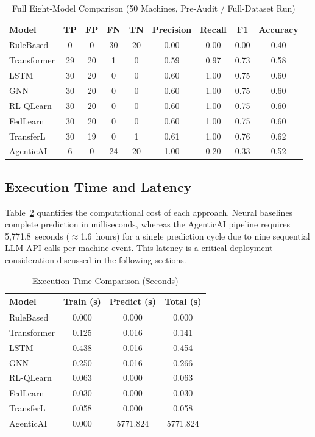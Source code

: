 \begin{table}[htbp]
\centering
\caption{Full Eight-Model Comparison (50 Machines, Pre-Audit / Full-Dataset Run)}
\label{tab:full_comparison}
\begin{tabular}{lcccccccc}
\hline
\textbf{Model} & \textbf{TP} & \textbf{FP} & \textbf{FN} & \textbf{TN} & \textbf{Precision} & \textbf{Recall} & \textbf{F1} & \textbf{Accuracy} \\
\hline
RuleBased  & 0  & 0  & 30 & 20 & 0.00 & 0.00 & 0.00 & 0.40 \\
Transformer& 29 & 20 & 1  & 0  & 0.59 & 0.97 & 0.73 & 0.58 \\
LSTM       & 30 & 20 & 0  & 0  & 0.60 & 1.00 & 0.75 & 0.60 \\
GNN        & 30 & 20 & 0  & 0  & 0.60 & 1.00 & 0.75 & 0.60 \\
RL-QLearn  & 30 & 20 & 0  & 0  & 0.60 & 1.00 & 0.75 & 0.60 \\
FedLearn   & 30 & 20 & 0  & 0  & 0.60 & 1.00 & 0.75 & 0.60 \\
TransferL  & 30 & 19 & 0  & 1  & 0.61 & 1.00 & 0.76 & 0.62 \\
AgenticAI  & 6  & 0  & 24 & 20 & 1.00 & 0.20 & 0.33 & 0.52 \\
\hline
\end{tabular}
\end{table}

\subsection{Execution Time and Latency}

Table~\ref{tab:execution_time} quantifies the computational cost of each approach. Neural baselines complete prediction in milliseconds, whereas the AgenticAI pipeline requires 5,771.8~seconds ($\approx$1.6~hours) for a single prediction cycle due to nine sequential LLM API calls per machine event. This latency is a critical deployment consideration discussed in the following sections.

\begin{table}[htbp]
\centering
\caption{Execution Time Comparison (Seconds)}
\label{tab:execution_time}
\begin{tabular}{lccc}
\hline
\textbf{Model} & \textbf{Train (s)} & \textbf{Predict (s)} & \textbf{Total (s)} \\
\hline
RuleBased  & 0.000 & 0.000 & 0.000 \\
Transformer& 0.125 & 0.016 & 0.141 \\
LSTM       & 0.438 & 0.016 & 0.454 \\
GNN        & 0.250 & 0.016 & 0.266 \\
RL-QLearn  & 0.063 & 0.000 & 0.063 \\
FedLearn   & 0.030 & 0.000 & 0.030 \\
TransferL  & 0.058 & 0.000 & 0.058 \\
AgenticAI  & 0.000 & 5771.824 & 5771.824 \\
\hline
\end{tabular}
\end{table}

